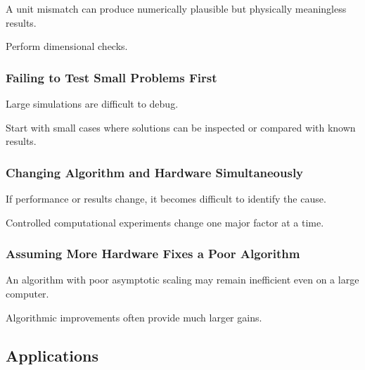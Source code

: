 A unit mismatch can produce numerically plausible but physically
meaningless results.

Perform dimensional checks.

\subsubsection{Failing to Test Small Problems First}

Large simulations are difficult to debug.

Start with small cases where solutions can be inspected or compared with
known results.

\subsubsection{Changing Algorithm and Hardware Simultaneously}

If performance or results change, it becomes difficult to identify the
cause.

Controlled computational experiments change one major factor at a time.

\subsubsection{Assuming More Hardware Fixes a Poor Algorithm}

An algorithm with poor asymptotic scaling may remain inefficient even on a
large computer.

Algorithmic improvements often provide much larger gains.

\subsection{Applications}
\label{subsec:scientific-computing-applications}

